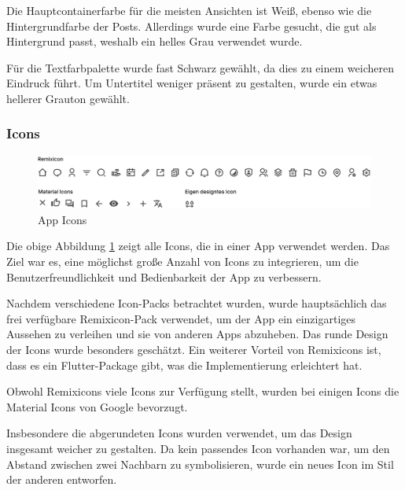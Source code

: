 Die Hauptcontainerfarbe für die meisten Ansichten ist Weiß, ebenso wie die Hintergrundfarbe der Posts. Allerdings wurde eine Farbe gesucht, die gut als Hintergrund passt, weshalb ein helles Grau verwendet wurde.

Für die Textfarbpalette wurde fast Schwarz gewählt, da dies zu einem weicheren Eindruck führt. Um Untertitel weniger präsent zu gestalten, wurde ein etwas hellerer Grauton gewählt.


\subsubsection{Icons}


\begin{figure}[ht]
  \centering
  \includegraphics[width=1\textwidth]{pics/icons.png}
  \caption{App Icons}
  \label{fig:app-icons}
\end{figure}

Die obige Abbildung \ref{fig:app-icons} zeigt alle Icons,
die in einer App verwendet werden. Das Ziel war es, eine
möglichst große Anzahl von Icons zu integrieren, um die
Benutzerfreundlichkeit und Bedienbarkeit der App zu
verbessern.

Nachdem verschiedene Icon-Packs betrachtet wurden, wurde hauptsächlich das frei verfügbare Remixicon-Pack\cite{remixicon} verwendet, um der App ein einzigartiges Aussehen zu verleihen und sie von anderen Apps abzuheben. Das runde Design der Icons wurde besonders geschätzt. Ein weiterer Vorteil von Remixicons ist, dass es ein Flutter-Package\cite{remixicon_flutter_package} gibt, was die Implementierung erleichtert hat.

Obwohl Remixicons viele Icons zur Verfügung stellt, wurden bei einigen Icons die Material Icons\cite{material_icons} von Google bevorzugt.

Insbesondere die abgerundeten Icons wurden verwendet, um das
Design insgesamt weicher zu gestalten. Da kein passendes
Icon vorhanden war, um den Abstand zwischen zwei Nachbarn zu
symbolisieren, wurde ein neues Icon im Stil der anderen
entworfen.

